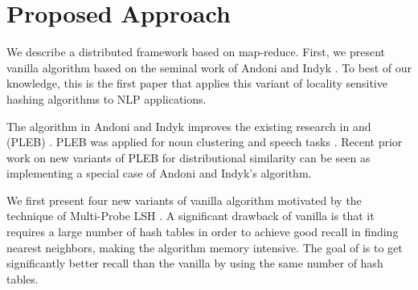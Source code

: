 


\section{Proposed Approach}
\label{sec:approach}
We describe a distributed \lshf framework based on map-reduce. 
First, we present vanilla \lsh algorithm based on the seminal work of Andoni and Indyk  . 
To best of our knowledge, this is the first paper that applies this variant of locality sensitive hashing algorithms to NLP applications. 

The algorithm in Andoni and Indyk  improves the existing research in \lsh and \plebf (PLEB) \cite{Indyk98STOC,Charikar02STOC}. 
PLEB was applied for noun clustering \cite{ravichandran05} and speech tasks \cite {JansenASRU11,JansenIS12}. 
Recent prior work on new variants of PLEB \cite{goyal12Flag} for distributional similarity can be seen as 
implementing a special case of Andoni and Indyk's \lsh algorithm. 

We first present four new variants of vanilla \lsh algorithm motivated by the technique of Multi-Probe LSH \cite{LvVLDB07}. 
A significant drawback of vanilla \lsh is that it requires a large number of hash tables in order to achieve good recall 
in finding nearest neighbors, making the algorithm memory intensive. The goal of  \mblshf 
is to get significantly better recall than the vanilla \lsh by using the same number of hash tables.



